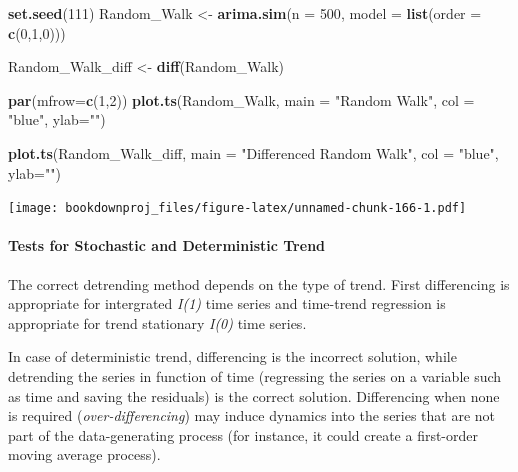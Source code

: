 \documentclass[
]{article}
\newenvironment{Shaded}{\begin{snugshade}}{\end{snugshade}}
\newcommand{\DataTypeTok}[1]{\textcolor[rgb]{0.13,0.29,0.53}{#1}}
\newcommand{\DecValTok}[1]{\textcolor[rgb]{0.00,0.00,0.81}{#1}}
\newcommand{\KeywordTok}[1]{\textcolor[rgb]{0.13,0.29,0.53}{\textbf{#1}}}
\newcommand{\NormalTok}[1]{#1}
\newcommand{\StringTok}[1]{\textcolor[rgb]{0.31,0.60,0.02}{#1}}
\begin{document}
\begin{Shaded}
\begin{Highlighting}[]
\KeywordTok{set.seed}\NormalTok{(}\DecValTok{111}\NormalTok{)}
\NormalTok{Random_Walk <-}\StringTok{ }\KeywordTok{arima.sim}\NormalTok{(}\DataTypeTok{n =} \DecValTok{500}\NormalTok{, }\DataTypeTok{model =} \KeywordTok{list}\NormalTok{(}\DataTypeTok{order =} \KeywordTok{c}\NormalTok{(}\DecValTok{0}\NormalTok{,}\DecValTok{1}\NormalTok{,}\DecValTok{0}\NormalTok{)))}

\NormalTok{Random_Walk_diff <-}\StringTok{ }\KeywordTok{diff}\NormalTok{(Random_Walk)}

\KeywordTok{par}\NormalTok{(}\DataTypeTok{mfrow=}\KeywordTok{c}\NormalTok{(}\DecValTok{1}\NormalTok{,}\DecValTok{2}\NormalTok{))}
\KeywordTok{plot.ts}\NormalTok{(Random_Walk,}
        \DataTypeTok{main =} \StringTok{"Random Walk"}\NormalTok{, }
        \DataTypeTok{col =} \StringTok{"blue"}\NormalTok{, }\DataTypeTok{ylab=}\StringTok{""}\NormalTok{)}

\KeywordTok{plot.ts}\NormalTok{(Random_Walk_diff, }
        \DataTypeTok{main =} \StringTok{"Differenced Random Walk"}\NormalTok{, }
        \DataTypeTok{col =} \StringTok{"blue"}\NormalTok{, }\DataTypeTok{ylab=}\StringTok{""}\NormalTok{)}
\end{Highlighting}
\end{Shaded}

\texttt{[image: bookdownproj\_files/figure-latex/unnamed-chunk-166-1.pdf]}

\hypertarget{tests-for-stochastic-and-deterministic-trend}{%
\paragraph{Tests for Stochastic and Deterministic Trend}\label{tests-for-stochastic-and-deterministic-trend}}

The correct detrending method depends on the type of trend. First differencing is appropriate for intergrated \emph{I(1)} time series and time-trend regression is appropriate for trend stationary \emph{I(0)} time series.

In case of deterministic trend, differencing is the incorrect solution, while detrending the series in function of time (regressing the series on a variable such as time and saving the residuals) is the correct solution. Differencing when none is required (\emph{over-differencing}) may induce dynamics into the series that are not part of the data-generating process (for instance, it could create a first-order moving average process).
\end{document}
